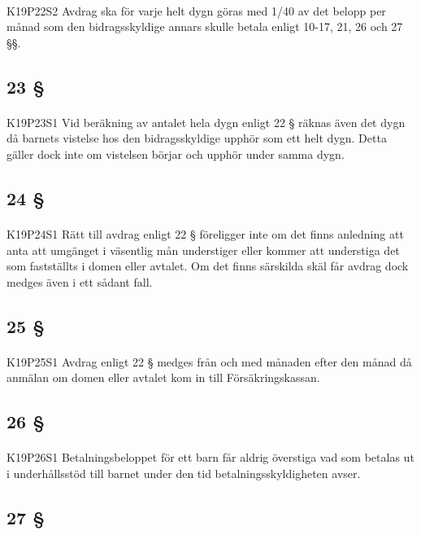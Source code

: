 \documentclass[a4paper,notitlepage,openany,10pt]{book}
\begin{document}
\paragraph*{}
{\tiny K19P22S2}
Avdrag ska för varje helt dygn göras med 1/40 av det belopp per månad som den bidragsskyldige annars skulle betala enligt 10-17, 21, 26 och 27 §§.
\subsection*{23 §}
\paragraph*{}
{\tiny K19P23S1}
Vid beräkning av antalet hela dygn enligt 22 § räknas även det dygn då barnets vistelse hos den bidragsskyldige upphör som ett helt dygn. Detta gäller dock inte om vistelsen börjar och upphör under samma dygn.
\subsection*{24 §}
\paragraph*{}
{\tiny K19P24S1}
Rätt till avdrag enligt 22 § föreligger inte om det finns anledning att anta att umgänget i väsentlig mån understiger eller kommer att understiga det som fastställts i domen eller avtalet. Om det finns särskilda skäl får avdrag dock medges även i ett sådant fall.
\subsection*{25 §}
\paragraph*{}
{\tiny K19P25S1}
Avdrag enligt 22 § medges från och med månaden efter den månad då anmälan om domen eller avtalet kom in till Försäkringskassan.
\subsection*{26 §}
\paragraph*{}
{\tiny K19P26S1}
Betalningsbeloppet för ett barn får aldrig överstiga vad som betalas ut i underhållsstöd till barnet under den tid betalningsskyldigheten avser.
\subsection*{27 §}
\end{document}
